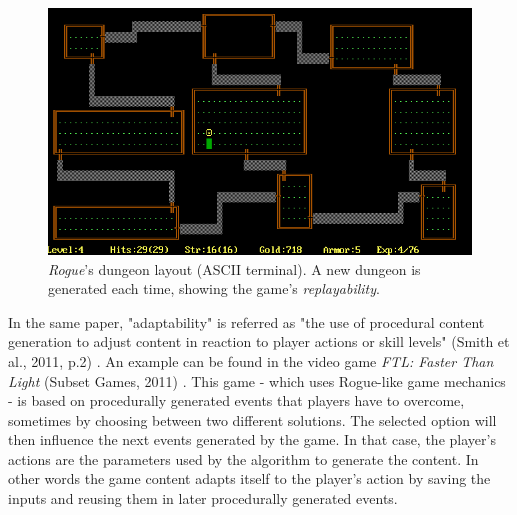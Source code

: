 \begin{figure}[!ht]
    \centering
    \includegraphics[scale=0.4]{Images/Rogue.png}
    \caption{\textit{Rogue}'s dungeon layout (ASCII terminal). A new dungeon is generated each time, showing the game's \textit{replayability}.}
    \label{fig:Rogue}
\end{figure}

In the same paper, "adaptability" is referred as "the use of procedural content generation to adjust content in reaction to player actions or skill levels" (Smith et al., 2011, p.2) \cite{pdf:pcgbased}. An example can be found in the video game \textit{FTL: Faster Than Light} (Subset Games, 2011) \cite{game:ftl}. This game - which uses Rogue-like game mechanics - is based on procedurally generated events that players have to overcome, sometimes by choosing between two different solutions. The selected option will then influence the next events generated by the game. In that case, the player's actions are the parameters used by the algorithm to generate the content. In other words the game content adapts itself to the player's action by saving the inputs and reusing them in later procedurally generated events.

